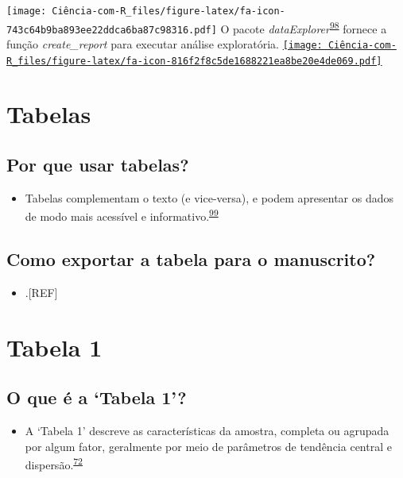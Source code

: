 \documentclass[
]{book}
\providecommand{\tightlist}{%
  \setlength{\itemsep}{0pt}\setlength{\parskip}{0pt}}
\begin{document}
\texttt{[image: Ciência-com-R\_files/figure-latex/fa-icon-743c64b9ba893ee22ddca6ba87c98316.pdf]} O pacote \emph{dataExplorer}\textsuperscript{\protect\hyperlink{ref-DataExplorer}{98}} fornece a função \emph{create\_report} para executar análise exploratória. \href{https://cran.r-project.org/web/packages/DataExplorer/index.html}{\texttt{[image: Ciência-com-R\_files/figure-latex/fa-icon-816f2f8c5de1688221ea8be20e4de069.pdf]}}

\hypertarget{tabelas}{%
\section{Tabelas}\label{tabelas}}

\hypertarget{por-que-usar-tabelas}{%
\subsection{Por que usar tabelas?}\label{por-que-usar-tabelas}}

\begin{itemize}
\tightlist
\item
  Tabelas complementam o texto (e vice-versa), e podem apresentar os dados de modo mais acessível e informativo.\textsuperscript{\protect\hyperlink{ref-Inskip2017}{99}}
\end{itemize}

\hypertarget{como-exportar-a-tabela-para-o-manuscrito}{%
\subsection{Como exportar a tabela para o manuscrito?}\label{como-exportar-a-tabela-para-o-manuscrito}}

\begin{itemize}
\tightlist
\item
  .{[}REF{]}
\end{itemize}

\hypertarget{tabela-1}{%
\section{Tabela 1}\label{tabela-1}}

\hypertarget{o-que-uxe9-a-tabela-1}{%
\subsection{O que é a `Tabela 1'?}\label{o-que-uxe9-a-tabela-1}}

\begin{itemize}
\tightlist
\item
  A `Tabela 1' descreve as características da amostra, completa ou agrupada por algum fator, geralmente por meio de parâmetros de tendência central e dispersão.\textsuperscript{\protect\hyperlink{ref-chen2020}{72}}
\end{itemize}
\end{document}
